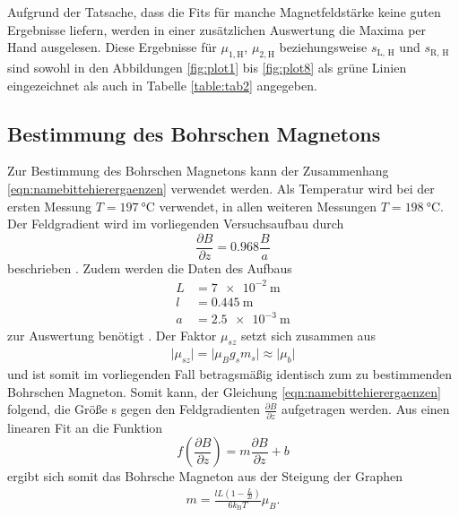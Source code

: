 Aufgrund der Tatsache, dass die Fits für manche Magnetfeldstärke keine guten Ergebnisse liefern, werden in einer zusätzlichen Auswertung die Maxima per Hand ausgelesen.
Diese Ergebnisse für $\mu_{1, \text{H}}$, $\mu_{2, \text{H}}$ beziehungsweise $s_\text{L, H}$ und $s_\text{R, H}$ sind sowohl in den Abbildungen \ref{fig:plot1} bis \ref{fig:plot8} als grüne Linien eingezeichnet als auch in Tabelle \ref{table:tab2} angegeben.


\subsection{Bestimmung des Bohrschen Magnetons}

Zur Bestimmung des Bohrschen Magnetons kann der Zusammenhang \eqref{eqn:namebittehierergaenzen} verwendet werden.
Als Temperatur wird bei der ersten Messung $T = \SI{197}{\celsius}$ verwendet, in allen weiteren Messungen $T = \SI{198}{\celsius}$.
Der Feldgradient wird im vorliegenden Versuchsaufbau durch
\begin{equation}
  \frac{\partial B}{\partial z} = \num{0.968} \frac{B}{a}
\end{equation}
beschrieben \cite{skript}.
Zudem werden die Daten des Aufbaus
\begin{align*}
  L &= \SI{7e-2}{\metre}\\
  l &= \SI{0.445}{\metre}\\
  a &= \SI{2.5e-3}{\metre}
\end{align*}
zur Auswertung benötigt \cite{skript}.
Der Faktor $\mu_{sz}$ setzt sich zusammen aus
\begin{align*}
  \lvert \mu_{sz} \rvert = \lvert \mu_B g_s m_s \rvert \approx \lvert \mu_b \rvert
\end{align*}
und ist somit im vorliegenden Fall betragsmäßig identisch zum zu bestimmenden Bohrschen Magneton.
Somit kann, der Gleichung \eqref{eqn:namebittehierergaenzen} folgend, die Größe s gegen den Feldgradienten $\frac{\partial B}{\partial z}$ aufgetragen werden.
Aus einen linearen Fit an die Funktion
\begin{equation}
  f\left(\frac{\partial B}{\partial z}\right) = m \frac{\partial B}{\partial z} + b
\end{equation}
ergibt sich somit das Bohrsche Magneton aus der Steigung der Graphen
\begin{align*}
  m = \frac{l L \left( 1 - \frac{L}{2l} \right)}{6 k_\text{B} T} \mu_B.
\end{align*}


